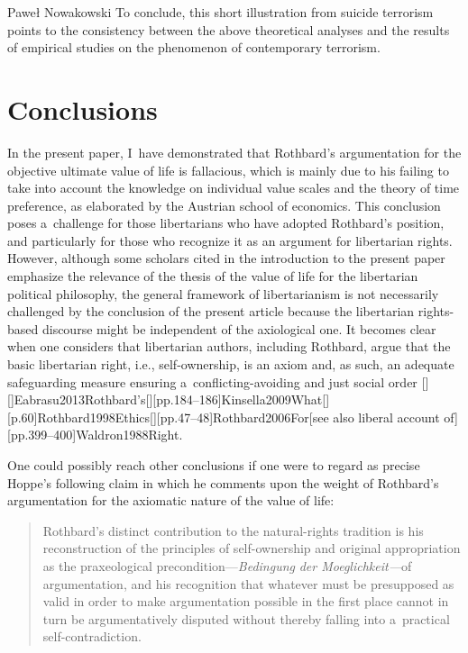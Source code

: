 \begin{artengenv}{Paweł Nowakowski}
To conclude, this short illustration from suicide terrorism points to the consistency between the above theoretical analyses and the results of empirical studies on the phenomenon of contemporary terrorism.



\section{Conclusions}

In the present paper, I~have demonstrated that Rothbard's argumentation for the objective ultimate value of life is fallacious, which is mainly due to his failing to take into account the knowledge on individual value scales and the theory of time preference, as elaborated by the Austrian school of economics. This conclusion poses a~challenge for those libertarians who have adopted Rothbard's position, and particularly for those who recognize it as an argument for libertarian rights. However, although some scholars cited in the introduction to the present paper emphasize the relevance of the thesis of the value of life for the libertarian political philosophy, the general framework of libertarianism is not necessarily challenged by the conclusion of the present article because the libertarian rights-based discourse might be independent of the axiological one. It becomes clear when one considers that libertarian authors, including Rothbard, argue that the basic libertarian right, i.e., self-ownership, is an axiom and, as such, an adequate safeguarding measure ensuring a~conflicting-avoiding and just social order 
\parencites[see, e.g.,][p.736]{Child1994Can}[][]{Eabrasu2013Rothbard’s}[][pp.184–186]{Kinsella2009What}[][p.60]{Rothbard1998Ethics}[][pp.47–48]{Rothbard2006For}[see also liberal account of][pp.399–400]{Waldron1988Right}.%




One could possibly reach other conclusions if one were to regard as precise Hoppe's 
\parencite*[][p.xxxiv]{Hoppe1998Introduction} %
 following claim in which he comments upon the weight of Rothbard's argumentation for the axiomatic nature of the value of life:



\begin{quote}
Rothbard's distinct contribution to the natural-rights tradition is his reconstruction of the principles of self-ownership and original appropriation as the praxeological precondition---\textit{Bedingung} \textit{der Moeglichkeit---}of argumentation, and his recognition that whatever must be presupposed as valid in order to make argumentation possible in the first place cannot in turn be argumentatively disputed without thereby falling into a~practical self-contradiction.
\end{quote}




\end{artengenv}
